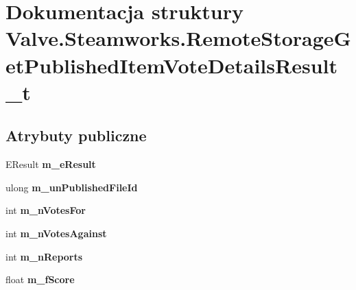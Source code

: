 \hypertarget{struct_valve_1_1_steamworks_1_1_remote_storage_get_published_item_vote_details_result__t}{}\section{Dokumentacja struktury Valve.\+Steamworks.\+Remote\+Storage\+Get\+Published\+Item\+Vote\+Details\+Result\+\_\+t}
\label{struct_valve_1_1_steamworks_1_1_remote_storage_get_published_item_vote_details_result__t}
\subsection*{Atrybuty publiczne}
\begin{DoxyCompactItemize}
\item 
\mbox{\label{struct_valve_1_1_steamworks_1_1_remote_storage_get_published_item_vote_details_result__t_adfb240eefb4e9275ca3381d922026c10}} 
E\+Result {\bfseries m\+\_\+e\+Result}
\item 
\mbox{\label{struct_valve_1_1_steamworks_1_1_remote_storage_get_published_item_vote_details_result__t_a63fead35f5c9bcae808de7c2c3ecc20a}} 
ulong {\bfseries m\+\_\+un\+Published\+File\+Id}
\item 
\mbox{\label{struct_valve_1_1_steamworks_1_1_remote_storage_get_published_item_vote_details_result__t_a5644dd41e96093105db6e7f73def85f0}} 
int {\bfseries m\+\_\+n\+Votes\+For}
\item 
\mbox{\label{struct_valve_1_1_steamworks_1_1_remote_storage_get_published_item_vote_details_result__t_a619c435958c95917b0bd2f90f97998d7}} 
int {\bfseries m\+\_\+n\+Votes\+Against}
\item 
\mbox{\label{struct_valve_1_1_steamworks_1_1_remote_storage_get_published_item_vote_details_result__t_a1ea06acbeb6f96e788ea6ebc64311b0c}} 
int {\bfseries m\+\_\+n\+Reports}
\item 
\mbox{\label{struct_valve_1_1_steamworks_1_1_remote_storage_get_published_item_vote_details_result__t_ad84465566a52cc4b442c70279fdc4374}} 
float {\bfseries m\+\_\+f\+Score}
\end{DoxyCompactItemize}


